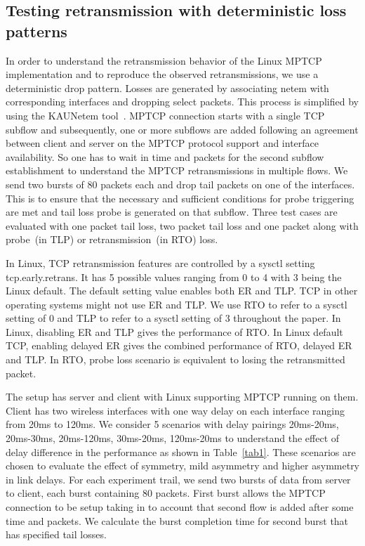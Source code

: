 \documentclass[10pt,conference,compsoc]{IEEEtran}
\begin{document}
\subsection{Testing retransmission with deterministic loss patterns}
In order to understand the retransmission behavior of the Linux MPTCP implementation and to reproduce the observed retransmissions, we use a deterministic drop pattern.
Losses are generated by associating netem with corresponding interfaces and dropping select packets. This process is simplified by using the KAUNetem tool~\cite{Garcia2016}. 
MPTCP connection starts with a single TCP subflow and subsequently, one or more subflows are added following an agreement between client and server on the MPTCP protocol 
support and interface availability. So one has to wait in time and packets for the second subflow establishment to understand the MPTCP retransmissions in multiple flows. We send two bursts of 80 
packets each and drop tail packets on one of the interfaces. This is to ensure that the necessary and sufficient conditions for probe triggering are met and tail loss probe is generated on that
subflow. Three test cases are evaluated with one packet tail loss, two packet tail loss and one packet along with probe~(in TLP) or retransmission~(in RTO) loss. 

In Linux, TCP retransmission features are controlled by a sysctl setting tcp.early.retrans. It has 5 possible values ranging from 0 to 4 with 3 being the Linux default. The default setting value enables both
ER and TLP. TCP in other operating systems might not use ER and TLP. We use RTO to refer to a sysctl setting of 0 and TLP to refer to a sysctl setting of 3 throughout the paper.
In Linux, disabling ER and TLP gives the performance of RTO. In Linux default TCP, enabling delayed ER gives the combined performance of RTO, delayed ER and TLP.
In RTO, probe loss scenario is equivalent to losing the retransmitted packet.

The setup has server and client with Linux supporting MPTCP running on them. Client has two wireless interfaces with one way delay on each interface ranging from 20ms to 120ms. We consider 5 scenarios with delay pairings 20ms-20ms, 20ms-30ms, 20ms-120ms, 30ms-20ms, 120ms-20ms to understand the effect of delay difference in the performance as shown in Table~\ref{tab1}. These scenarios are chosen to evaluate the effect of symmetry, mild asymmetry and higher asymmetry in link delays. For each experiment trail, we send two bursts of data from server to client, each burst containing 80 packets. First burst allows the MPTCP connection to be setup taking in to account that second flow is added after some time and packets. We calculate the burst completion time for second burst that has specified tail losses.
\end{document}
